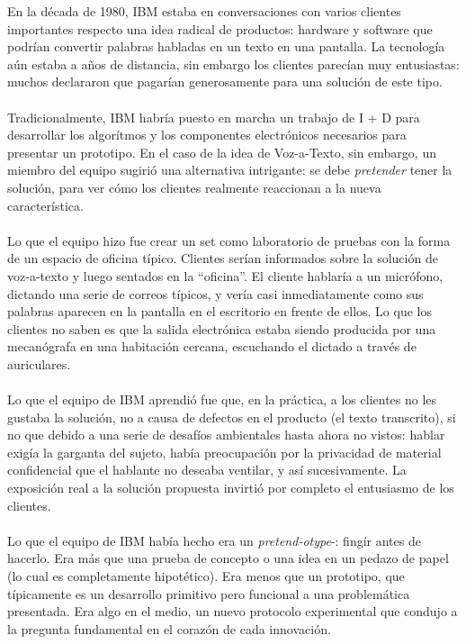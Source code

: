 \documentclass{article}
\begin{document}
En la d\'ecada de 1980, IBM estaba en conversaciones con varios clientes importantes respecto una idea radical de productos: hardware y software que podr\'ian convertir palabras habladas en un texto en una pantalla. La tecnolog\'ia a\'un estaba a a\~nos de distancia, sin embargo los clientes parec\'ian muy entusiastas: muchos declararon que pagar\'ian generosamente para una soluci\'on de este tipo.
\\ \\
Tradicionalmente, IBM habr\'ia puesto en marcha un trabajo de I + D para desarrollar los algor\'itmos y los componentes electr\'onicos necesarios para presentar un prototipo. En el caso de la idea de Voz-a-Texto, sin embargo, un miembro del equipo sugiri\'o una alternativa intrigante: se debe \textit{pretender} tener la soluci\'on, para ver c\'omo los clientes realmente reaccionan a la nueva caracter\'istica.
\\ \\
Lo que el equipo hizo fue crear un set como laboratorio de pruebas con la forma de un espacio de oficina t\'ipico. Clientes ser\'ian informados sobre la soluci\'on de voz-a-texto y luego sentados en la ``oficina''. El cliente hablar\'ia a un micr\'ofono, dictando una serie de correos t\'ipicos, y ver\'ia casi inmediatamente como sus palabras aparecen en la pantalla en el escritorio en frente de ellos. Lo que los clientes no saben es que la salida electr\'onica estaba siendo producida por una mecan\'ografa en una habitaci\'on cercana, escuchando el dictado a trav\'es de auriculares.
\\ \\
Lo que el equipo de IBM aprendi\'o fue que, en la pr\'actica, a los clientes no les gustaba la soluci\'on, no a causa de defectos en el producto (el texto transcrito), si no que debido a una serie de desaf\'ios ambientales hasta ahora no vistos: hablar exig\'ia la garganta del sujeto, hab\'ia preocupaci\'on por la privacidad de material confidencial que el hablante no deseaba ventilar, y as\'i sucesivamente. La exposici\'on real a la soluci\'on propuesta invirti\'o por completo el entusiasmo de los clientes.
\\ \\
Lo que el equipo de IBM hab\'ia hecho era un \textit{pretend-otype}-: fing\'ir antes de hacerlo. Era m\'as que una prueba de concepto o una idea en un pedazo de papel (lo cual es completamente hipot\'etico). Era menos que un prototipo, que t\'ipicamente es un desarrollo primitivo pero funcional a una problem\'atica presentada. Era algo en el medio, un nuevo protocolo experimental que condujo a la pregunta fundamental en el coraz\'on de cada innovaci\'on.\\
\end{document}
